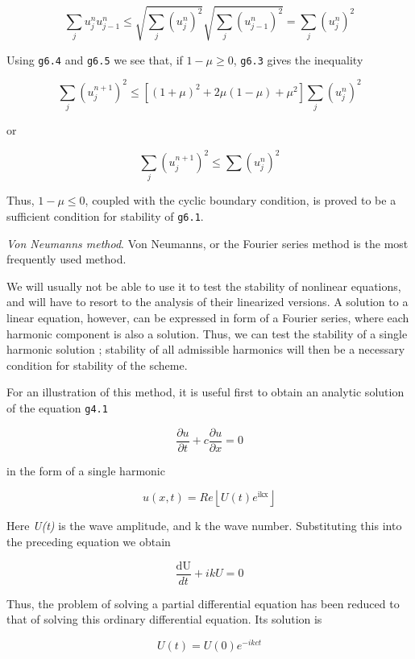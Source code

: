     \[\sum_{j}^{}u_{j}^{n}u_{j - 1}^{n} \leq \sqrt{\sum_{j}^{}\left( u_{j}^{n} \right)^{2}}\sqrt{\sum_{j}^{}
    \left( u_{j - 1}^{n} \right)^{2}} =\sum_{j}^{}\left( u_{j}^{n} \right)^{2}\]

Using \texttt{g6.4} and \texttt{g6.5} we see that, if
\(1 - \mu \geq 0\), \texttt{g6.3} gives the inequality

\[{\sum_{j}^{}\left( u_{j}^{n + 1} \right)}^{2} \leq \left\lbrack \left( 1 + \mu \right)^{2} +
2\mu\left( 1 - \mu \right) + \mu^{2} \right\rbrack\sum_{j}^{}\left( u_{j}^{n} \right)^{2}\]

or

\[{\sum_{j}^{}\left( u_{j}^{n + 1} \right)}^{2} \leq \sum_{}^{}\left( u_{j}^{n} \right)^{2}\]

Thus, \( 1 - \mu \leq 0\), coupled with the cyclic boundary condition,
is proved to be a sufficient condition for stability of \texttt{g6.1}.

\emph{Von Neumann\textquotesingle s method}. Von
Neumann\textquotesingle s, or the Fourier series method is the most
frequently used method.

We will usually not be able to use it to test the stability of nonlinear
equations, and will have to resort to the analysis of their linearized
versions. A solution to a linear equation, however, can be expressed in
form of a Fourier series, where each harmonic component is also a
solution. Thus, we can test the stability of a single harmonic solution
; stability of all admissible harmonics will then be a necessary
condition for stability of the scheme.

For an illustration of this method, it is useful first to obtain an
analytic solution of the equation \texttt{g4.1}

\[\frac{\partial u}{\partial t}+c \frac{\partial u}{\partial x}=0\]

in the form of a single harmonic

    \[u\left( x,t \right) = Re\left\lfloor U\left( t \right)e^{\text{ikx}} \right\rfloor\]

Here \emph{U(t)} is the wave amplitude, and k the wave number.
Substituting this into the preceding equation we obtain

\[\frac{\text{dU}}{d t} +ikU = 0\]

Thus, the problem of solving a partial differential equation has been
reduced to that of solving this ordinary differential equation. Its
solution is

\[U(t) =U(0)e^{- ikct}\]

